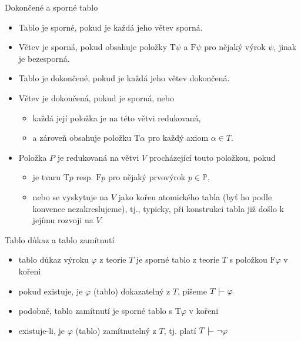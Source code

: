 \documentclass{beamer}
\begin{document}
\begin{frame}{Dokončené a sporné tablo}

    \begin{itemize}
        \item Tablo je \alert{sporné}, pokud je každá jeho větev sporná.
        \item Větev je \alert{sporná}, pokud obsahuje položky $\mathrm{T}\psi$ a $\mathrm{F}\psi$ pro nějaký výrok $\psi$, jinak je \alert{bezesporná}.
        \item Tablo je \alert{dokončené}, pokud je každá jeho větev dokončená.
        \item Větev je \alert{dokončená}, pokud je sporná, nebo
        \begin{itemize}
            \item každá její položka je na této větvi \alert{redukovaná},
            \item a zároveň obsahuje položku $\mathrm{T}\alpha$ pro každý axiom $\alpha\in T$.
        \end{itemize}
         
        \item Položka $P$ je \alert{redukovaná} na větvi $V$ procházející touto položkou, pokud 
        \begin{itemize}
            \item je tvaru $\mathrm{T}p$ resp. $\mathrm{F}p$ pro nějaký prvovýrok $p\in\mathbb P$, 
            \item nebo se vyskytuje na $V$ jako kořen atomického tabla (byť ho podle konvence nezakreslujeme), tj., typicky, při konstrukci tabla již došlo k jejímu rozvoji na $V$.
        \end{itemize}
    \end{itemize}

\end{frame}


\begin{frame}{Tablo důkaz a tablo zamítnutí}

    \begin{itemize}
        \item \alert{tablo důkaz} výroku $\varphi$ z teorie $T$ je \alert{sporné} tablo z teorie $T$ s položkou $\mathrm{F}\varphi$ v kořeni
        \item pokud existuje, je $\varphi$ \alert{(tablo) dokazatelný} z $T$, píšeme \alert{$T\proves\varphi$}
        \item podobně, \alert{tablo zamítnutí} je sporné tablo s $\mathrm{T}\varphi$ v kořeni
        \item existuje-li, je $\varphi$ \alert{(tablo) zamítnutelný} z $T$, tj. platí \alert{$T\proves\neg\varphi$}
    \end{itemize}

\end{frame}
\end{document}
